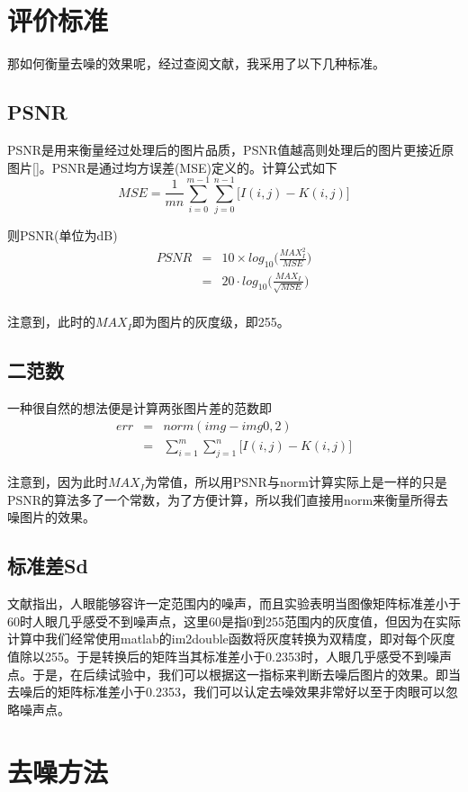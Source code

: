 \documentclass[a4paper,left=2.5cm,right=2.5cm]{article}
\begin{document}
\begin{spacing}{1.6}
		\section{评价标准}
		那如何衡量去噪的效果呢，经过查阅文献，我采用了以下几种标准。
		\subsection{PSNR}
		PSNR是用来衡量经过处理后的图片品质，PSNR值越高则处理后的图片更接近原图片[\cite{wiki}]。PSNR是通过均方误差(MSE)定义的。计算公式如下
		\begin{equation}
		MSE = \frac{1}{mn}\sum\limits_{i=0}^{m-1}\sum\limits_{j=0}^{n-1}\Big[I(i,j)-K(i,j)\Big]
		\end{equation}
		
		则PSNR(单位为dB)
		\begin{eqnarray}
		PSNR &=& 10\times log_{10}\Big(\frac{MAX_I^2}{MSE}\Big)\\
		&=& 20\cdot log_{10}\Big(\frac{MAX_I}{\sqrt{MSE}}\Big)\\
		\end{eqnarray}
		
		注意到，此时的$MAX_I$即为图片的灰度级，即255。
		\subsection{二范数}
		一种很自然的想法便是计算两张图片差的范数即
		\begin{eqnarray}
		err &=& norm(img - img0, 2)\\
		&=&\sum\limits_{i=1}^{m}\sum\limits_{j=1}^{n}\Big[I(i,j)-K(i,j)\Big]
		\end{eqnarray}
		
		注意到，因为此时$MAX_I$为常值，所以用PSNR与norm计算实际上是一样的只是PSNR的算法多了一个常数，为了方便计算，所以我们直接用norm来衡量所得去噪图片的效果。
		\subsection{标准差Sd}
		文献\cite{hal}指出，人眼能够容许一定范围内的噪声，而且实验表明当图像矩阵标准差小于60时人眼几乎感受不到噪声点，这里60是指0到255范围内的灰度值，但因为在实际计算中我们经常使用matlab的im2double函数将灰度转换为双精度，即对每个灰度值除以255。于是转换后的矩阵当其标准差小于0.2353时，人眼几乎感受不到噪声点。于是，在后续试验中，我们可以根据这一指标来判断去噪后图片的效果。即当去噪后的矩阵标准差小于0.2353，我们可以认定去噪效果非常好以至于肉眼可以忽略噪声点。
		\section{去噪方法}

\end{spacing}
\end{document}
